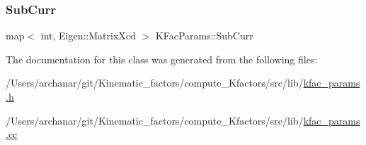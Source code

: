 \mbox{\label{classKFacParams_a29e84cd39c74d0535bc19cea03f4b6b1}} 
\subsubsection{\texorpdfstring{SubCurr}{SubCurr}}
{\footnotesize\ttfamily map$<$ int, Eigen\+::\+Matrix\+Xcd $>$ K\+Fac\+Params\+::\+Sub\+Curr}



The documentation for this class was generated from the following files\+:\begin{DoxyCompactItemize}
\item 
/\+Users/archanar/git/\+Kinematic\+\_\+factors/compute\+\_\+\+Kfactors/src/lib/\mbox{\hyperlink{kfac__params_8h}{kfac\+\_\+params.\+h}}\item 
/\+Users/archanar/git/\+Kinematic\+\_\+factors/compute\+\_\+\+Kfactors/src/lib/\mbox{\hyperlink{kfac__params_8cc}{kfac\+\_\+params.\+cc}}\end{DoxyCompactItemize}
